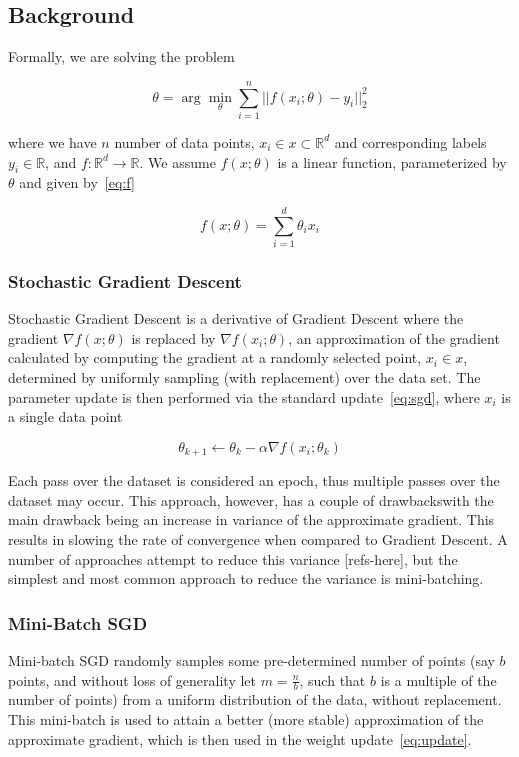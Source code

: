 \documentclass[,conference,compsoc]{IEEEtran}
\begin{document}
\subsection{Background}
Formally, we are solving the problem

\begin{equation}\label{eq:update}
    \theta = \arg \min_{\theta} \sum_{i=1}^n ||f(x_i; \theta) - y_i||_2^2
\end{equation}

where we have $n$ number of data points, $x_i \in x \subset \mathbb{R}^d$ and
corresponding labels $y_i \in \mathbb{R}$, and $f: \mathbb{R}^d \rightarrow
\mathbb{R}$. We assume $f(x;\theta)$ is a linear function, parameterized by
$\theta$ and given by~\ref{eq:f}

\begin{equation}\label{eq:f}
    f(x; \theta) = \sum_{i = 1}^d \theta_i x_i
\end{equation}


\subsubsection{Stochastic Gradient Descent}
Stochastic Gradient Descent is a derivative of Gradient Descent where the
gradient $\nabla f(x; \theta)$ is replaced by $\nabla f(x_i; \theta)$, an
approximation of the gradient calculated by computing the gradient at a randomly
selected point, $x_i \in x$, determined by uniformly sampling (with replacement) over the
data set. The parameter update is then performed via the standard
update~\ref{eq:sgd}, where $x_i$ is a single data point

\begin{equation}\label{eq:sgd}
    \theta_{k+1} \gets \theta_k - \alpha \nabla f(x_i; \theta_k)
\end{equation}

Each pass over the dataset is considered an epoch, thus multiple passes over the
dataset may occur. This approach, however, has a couple of drawbackswith the
main drawback being an increase in variance of the approximate gradient. This
results in slowing the rate of convergence when compared to Gradient Descent. A
number of approaches attempt to reduce this variance [refs-here], but the
simplest and most common approach to reduce the variance is mini-batching.

\subsubsection{Mini-Batch SGD}
Mini-batch SGD randomly samples some pre-determined number of points (say $b$
points, and without loss of generality let $m = \frac{n}{b}$, such that $b$ is a
multiple of the number of points) from a uniform distribution of the data,
without replacement. This mini-batch is used to attain a better (more stable)
approximation of the approximate gradient, which is then used in the weight
update~\ref{eq:update}.
\end{document}
